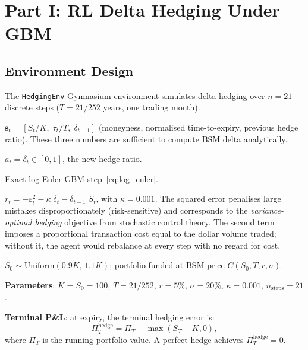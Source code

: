 \documentclass[12pt,a4paper]{article}
\begin{document}
\section{Part I: RL Delta Hedging Under GBM}
\label{sec:p1}

\subsection{Environment Design}

The \texttt{HedgingEnv} Gymnasium environment simulates delta hedging over
$n=21$ discrete steps ($T = 21/252$ years, one trading month).

\begin{description}[leftmargin=2cm]
  \item[State] $\mathbf{s}_t = [S_t/K,\;\tau_t/T,\;\delta_{t-1}]$
    (moneyness, normalised time-to-expiry, previous hedge ratio).
    These three numbers are sufficient to compute BSM delta analytically.
  \item[Action] $a_t = \delta_t \in [0,1]$, the new hedge ratio.
  \item[Dynamics] Exact log-Euler GBM step~\eqref{eq:log_euler}.
  \item[Reward] $r_t = -\varepsilon_t^2 - \kappa|\delta_t-\delta_{t-1}|S_t$,
    with $\kappa = 0.001$.  The squared error penalises large mistakes
    disproportionately (risk-sensitive) and corresponds to the
    \emph{variance-optimal hedging} objective from stochastic control theory.
    The second term imposes a proportional transaction cost equal to the
    dollar volume traded; without it, the agent would rebalance at every step
    with no regard for cost.
  \item[Initialisation] $S_0\sim\mathrm{Uniform}(0.9K,\,1.1K)$;
    portfolio funded at BSM price $C(S_0,T,r,\sigma)$.
\end{description}

\textbf{Parameters}: $K = S_0 = 100$, $T = 21/252$, $r = 5\%$,
$\sigma = 20\%$, $\kappa = 0.001$, $n_{\mathrm{steps}} = 21$.

\textbf{Terminal P\&L}: at expiry, the terminal hedging error is:
\begin{equation}
  \Pi_T^{\mathrm{hedge}} = \Pi_T - \max(S_T - K, 0),
  \label{eq:terminal_pnl}
\end{equation}
where $\Pi_T$ is the running portfolio value.  A perfect hedge achieves
$\Pi_T^{\mathrm{hedge}} = 0$.
\end{document}

